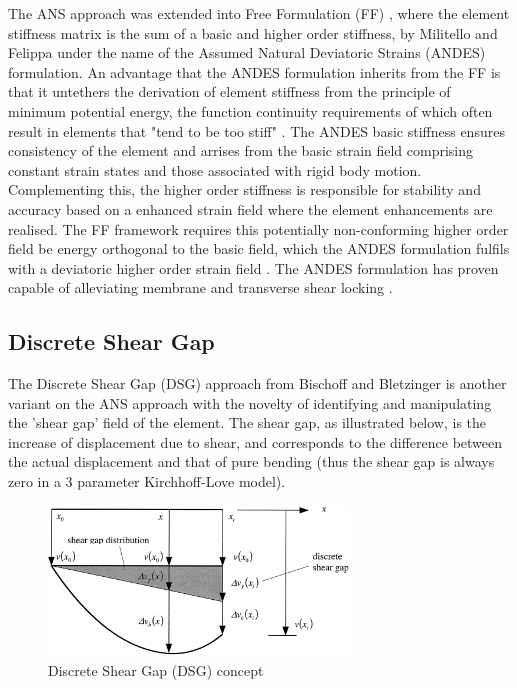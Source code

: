 The ANS approach was extended into Free Formulation (FF) \cite{Bergan84}, where the element stiffness matrix is the sum of a basic and higher order stiffness, by Militello and Felippa \cite{FELIPPA1990} under the name of the Assumed Natural Deviatoric Strains (ANDES) formulation. An advantage that the ANDES formulation inherits from the FF is that it untethers the derivation of element stiffness from the principle of minimum potential energy, the function continuity requirements of which often result in elements that "tend to be too stiff" \cite{Bergan84}. The ANDES basic stiffness ensures consistency of the element and arrises from the basic strain field comprising constant strain states and those associated with rigid body motion. Complementing this, the higher order stiffness is responsible for stability and accuracy \cite{Felippa2003} based on a enhanced strain field where the element enhancements are realised. The FF framework requires this potentially non-conforming higher order field be energy orthogonal to the basic field, which the ANDES formulation fulfils with a deviatoric higher order strain field \cite{felippa2002fitting}.  The ANDES formulation has proven capable of alleviating membrane and transverse shear locking \cite{Mostafa11}.

\subsection{Discrete Shear Gap}
\label{DSGbackground}

The Discrete Shear Gap (DSG) approach from Bischoff and Bletzinger \cite{Ble00} \cite{Bis04} is another variant on the ANS approach with the novelty of identifying and manipulating the 'shear gap' field of the element. The shear gap, as illustrated below, is the increase of displacement due to shear, and corresponds to the difference between the actual displacement and that of pure bending (thus the shear gap is always zero in a 3 parameter Kirchhoff-Love model).

\begin{figure}[H]
	\centering
	\def\svgwidth{\columnwidth}
	\includegraphics[width=8cm]{images/DSG.png}
	\caption{Discrete Shear Gap (DSG) concept \cite{Ble00}}
	\label{ansexample}
\end{figure}

